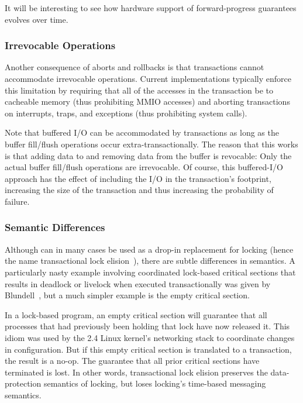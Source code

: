 It will be interesting to see how hardware support of forward-progress
guarantees evolves over time.

\subsubsection{Irrevocable Operations}
\label{sec:future:Irrevocable Operations}

Another consequence of aborts and rollbacks is that  transactions
cannot accommodate irrevocable operations.
Current  implementations typically enforce this limitation by
requiring that all of the accesses in the transaction be to cacheable
memory (thus prohibiting MMIO accesses) and aborting transactions on
interrupts, traps, and exceptions (thus prohibiting system calls).

Note that buffered I/O can be accommodated by  transactions as
long as the buffer fill/flush operations occur extra-transactionally.
The reason that this works is that adding data to and removing data
from the buffer is revocable: Only the actual buffer fill/flush
operations are irrevocable.
Of course, this buffered-I/O approach has the effect of including the I/O
in the transaction's footprint, increasing the size of the transaction
and thus increasing the probability of failure.

\subsubsection{Semantic Differences}
\label{sec:future:Semantic Differences}

Although  can in many cases be used as a drop-in replacement for locking
(hence the name transactional lock
elision~\cite{DaveDice2008TransactLockElision}),
there are subtle differences in semantics.
A particularly nasty example involving coordinated lock-based critical
sections that results in deadlock or livelock when executed transactionally
was given by Blundell~\cite{Blundell2006TMdeadlock}, but a much simpler
example is the empty critical section.

In a lock-based program, an empty critical section will guarantee
that all processes that had previously been holding that lock have
now released it.
This idiom was used by the 2.4 Linux kernel's networking stack to
coordinate changes in configuration.
But if this empty critical section is translated to a transaction,
the result is a no-op.
The guarantee that all prior critical sections have terminated is
lost.
In other words, transactional lock elision preserves the data-protection
semantics of locking, but loses locking's time-based messaging semantics.

